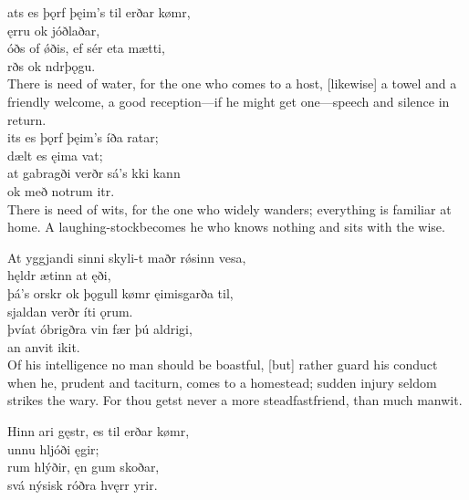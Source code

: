 \bva {}ats es þǫrf \hld þęim's til erðar kømr, \\%
\ind {}ęrru ok jóðlaðar, \\%
óðs of ǿðis, \hld ef sér eta mætti, \\%
\ind {}rðs ok ndrþǫgu.\\%

\bvb There is need of water, for the one who comes to a host, [likewise] a towel and a friendly welcome, a good reception—if he might get one—speech and silence in return. \\

\bva {}its es þǫrf \hld þęim's íða ratar; \\%
\ind dælt es ęima vat; \\%
at gabragði \hld verðr sá's kki kann \\%
\ind ok með notrum itr.\\%

\bvb There is need of wits, for the one who widely wanders; everything is familiar at home. A laughing-stock\footnotemark[8] becomes he who knows nothing and sits with the wise. \\

\bva At yggjandi sinni \hld skyli-t maðr rǿsinn vesa, \\%
\ind hęldr ætinn at ęði, \\%
þá's orskr ok þǫgull \hld kømr ęimisgarða til, \\%
\ind sjaldan verðr íti ǫrum. \\%
þvíat óbrigðra vin \hld fær þú aldrigi, \\%
\ind an anvit ikit.\\%

\bvb Of his intelligence no man should be boastful, [but] rather guard his conduct when he, prudent and taciturn, comes to a homestead; sudden injury seldom strikes the wary. For thou getst never a more steadfast\footnotemark[10] friend, than much manwit. \\

\bva Hinn ari gęstr, \hld es til erðar kømr, \\%
\ind {}unnu hljóði ęgir; \\%
rum hlýðir, \hld ęn gum skoðar, \\%
\ind svá nýsisk róðra hvęrr yrir.\\%

